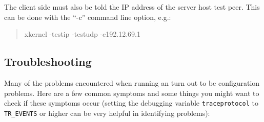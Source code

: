 The client side
must also be told the IP address of the server host test peer.  This can be
done with the ``-c'' command line option, e.g.:

\begin{quote}
\begin{tt}
xkernel -testip -testudp -c192.12.69.1
\end{tt}
\end{quote}



\subsection{Troubleshooting}

Many of the problems encountered when running an \xk{} turn out to be
configuration problems.  Here are a few common symptoms and some
things you might want to check if these symptoms occur (setting the
debugging variable {\tt traceprotocol} to {\tt TR\_EVENTS} or higher
can be very helpful in identifying problems):

